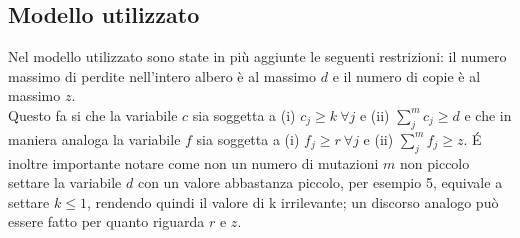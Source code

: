 \documentclass{report}
\begin{document}
  \subsection{Modello utilizzato}
  Nel modello utilizzato sono state in più aggiunte le seguenti restrizioni: il numero massimo di perdite nell'intero albero è al massimo $d$ e il numero di copie è al massimo $z$.\\
  Questo fa si che la variabile $c$ sia soggetta a (i) ${c}_{j}\geq k \ \forall j$ e (ii) $\sum_{j}^m {c}_{j} \geq d$ e che in maniera analoga la variabile $f$ sia soggetta a (i) ${f}_{j}\geq r \ \forall j$ e (ii) $\sum_{j}^m {f}_{j} \geq z$.
  \'E inoltre importante notare come non un numero di mutazioni $m$ non piccolo settare la variabile $d$ con un valore abbastanza piccolo, per esempio 5, equivale a settare $k\leq 1$, rendendo quindi il valore di k irrilevante; un discorso analogo può essere fatto per quanto riguarda $r$ e $z$.
\end{document}
